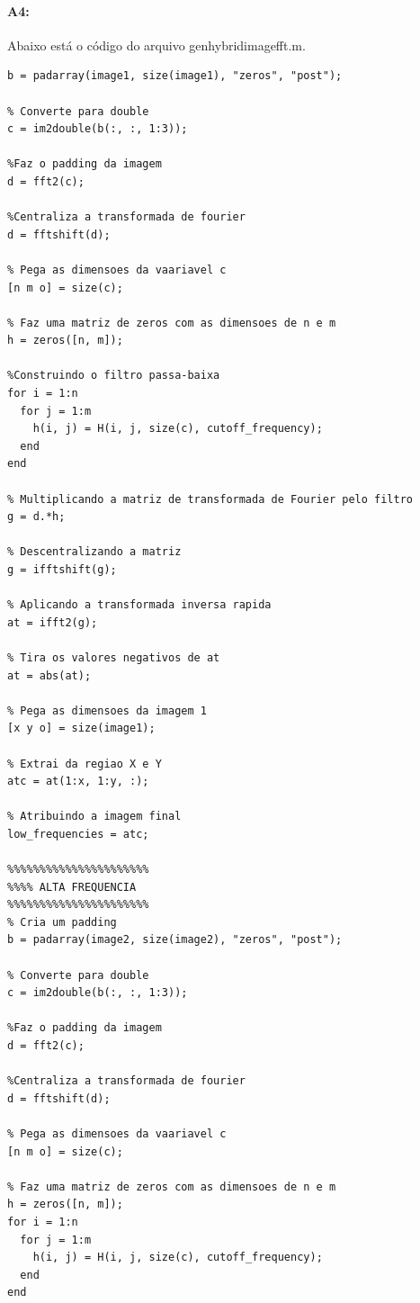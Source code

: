 \paragraph{A4:}


Abaixo está o código do arquivo gen\textunderscore hybrid\textunderscore image\textunderscore fft.m.

\begin{lstlisting}[style=Matlab-editor]
% Cria um padding
b = padarray(image1, size(image1), "zeros", "post");

% Converte para double
c = im2double(b(:, :, 1:3));

%Faz o padding da imagem
d = fft2(c);

%Centraliza a transformada de fourier
d = fftshift(d);

% Pega as dimensoes da vaariavel c
[n m o] = size(c);

% Faz uma matriz de zeros com as dimensoes de n e m
h = zeros([n, m]);

%Construindo o filtro passa-baixa
for i = 1:n
  for j = 1:m
    h(i, j) = H(i, j, size(c), cutoff_frequency);
  end
end

% Multiplicando a matriz de transformada de Fourier pelo filtro
g = d.*h;

% Descentralizando a matriz
g = ifftshift(g);

% Aplicando a transformada inversa rapida
at = ifft2(g);

% Tira os valores negativos de at
at = abs(at);

% Pega as dimensoes da imagem 1
[x y o] = size(image1);

% Extrai da regiao X e Y
atc = at(1:x, 1:y, :);

% Atribuindo a imagem final
low_frequencies = atc;

%%%%%%%%%%%%%%%%%%%%%%
%%%% ALTA FREQUENCIA 
%%%%%%%%%%%%%%%%%%%%%%
% Cria um padding
b = padarray(image2, size(image2), "zeros", "post");

% Converte para double
c = im2double(b(:, :, 1:3));

%Faz o padding da imagem
d = fft2(c);

%Centraliza a transformada de fourier
d = fftshift(d);

% Pega as dimensoes da vaariavel c
[n m o] = size(c);

% Faz uma matriz de zeros com as dimensoes de n e m
h = zeros([n, m]);
for i = 1:n
  for j = 1:m
    h(i, j) = H(i, j, size(c), cutoff_frequency);
  end
end


\end{lstlisting}

